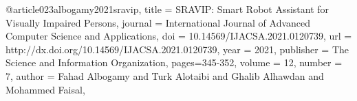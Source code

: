 @article{023albogamy2021sravip,
title = {SRAVIP: Smart Robot Assistant for Visually Impaired Persons},
journal = {International Journal of Advanced Computer Science and Applications},
doi = {10.14569/IJACSA.2021.0120739},
url = {http://dx.doi.org/10.14569/IJACSA.2021.0120739},
year = {2021},
publisher = {The Science and Information Organization},
pages={345-352},
volume = {12},
number = {7},
author = {Fahad Albogamy and Turk Alotaibi and Ghalib Alhawdan and Mohammed Faisal},
}